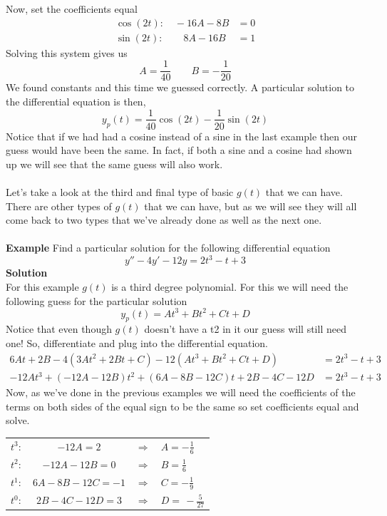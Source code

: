 \documentclass[10pt,reqno]{book}
\theoremstyle{definition}
\begin{document}
	Now, set the coefficients equal
	\begin{align*}
	\cos(2t): \quad -16A - 8B &= 0\\
	\sin(2t): \qquad 8A - 16B &= 1
	\end{align*}
	Solving this system gives us
	\[ A = \frac{1}{40} \qquad B = -\frac{1}{20} \]
	We found constants and this time we guessed correctly. A particular solution to the differential equation is then,
	\[ y_p(t) = \frac{1}{40}\cos(2t) - \frac{1}{20}\sin(2t) \]
	Notice that if we had had a cosine instead of a sine in the last example then our guess would have been the same. In fact, if both a sine and a cosine had shown up we will see that the same guess will also work.\\ \\
	Let's take a look at the third and final type of basic $ g(t) $ that we can have. There are other types of $ g(t) $ that we can have, but as we will see they will all come back to two types that we've already done as well as the next one.\\ \\
	\textbf{Example} Find a particular solution for the following differential equation
	\[ y'' - 4y' - 12y = 2t^3 -t + 3 \]
	\textbf{Solution}\\
	For this example $ g(t) $ is a third degree polynomial. For this we will need the following guess for the particular solution
	\[ y_p(t) = At^3 + Bt^2 + Ct + D \]
	Notice that even though $ g(t) $ doesn't have a t2 in it our guess will still need one!  So, differentiate and plug into the differential equation.
	\begin{align*}
		6At + 2B - 4(3At^2 + 2Bt + C) - 12(At^3 + Bt^2 + Ct + D) &= 2t^3 - t + 3\\
		-12At^3 + (-12A - 12B)t^2 + (6A - 8B - 12C)t + 2B - 4C - 12D &= 2t^3 - t + 3
	\end{align*}
	Now, as we've done in the previous examples we will need the coefficients of the terms on both sides of the equal sign to be the same so set coefficients equal and solve.
	\begin{center}
	\begin{tabular}{lcll}
		$ t^3: $ & $ -12A =2 $  & $ \Rightarrow $ & $ \displaystyle{A = -\frac{1}{6}} $ \\
		$ t^2: $ & $ -12A - 12B = 0 $ & $ \Rightarrow $ & $ \displaystyle{B = \frac{1}{6}} $  \\
		$ t^1: $   & $ 6A - 8B - 12C = -1 $ & $ \Rightarrow $ & $ \displaystyle{C = -\frac{1}{9}}$ \\
		$ t^0: $ & $ 2B - 4C - 12D = 3 $ & $ \Rightarrow $ & $ \displaystyle{D =\, -\frac{5}{27}} $
	\end{tabular}
	\end{center}
\end{document}

